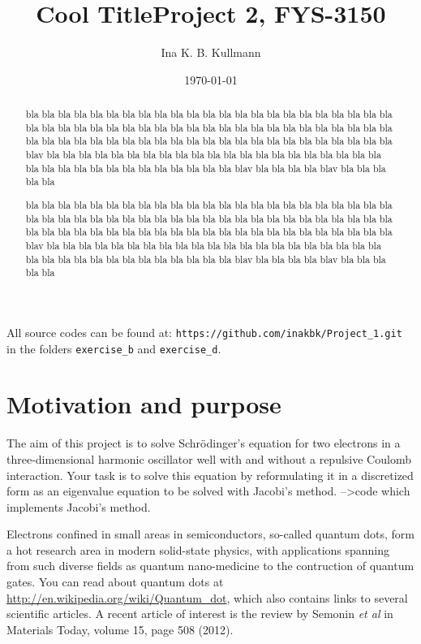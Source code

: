 \documentclass[11pt,a4wide]{article}
\title{{\Huge {\bf Cool Title}}\linebreak \small{Project 2, FYS-3150}}
\author{Ina K. B. Kullmann}
\date{\today}
\begin{document}
\maketitle

{\scriptsize \noindent All source codes can be found at: \texttt{https://github.com/inakbk/Project\_1.git} in the folders \texttt{exercise\_b} and \texttt{exercise\_d}. }

\tableofcontents
\newpage

\begin{abstract}
bla bla bla bla bla bla bla bla bla bla bla bla bla bla bla bla bla bla bla bla bla bla bla bla bla bla bla bla bla bla bla bla bla bla bla bla bla bla bla bla bla bla bla bla bla bla bla bla bla bla bla bla bla bla bla bla bla bla bla bla bla bla bla bla bla bla bla bla bla blav bla bla bla bla bla bla bla bla bla bla bla bla bla bla bla bla bla bla bla bla bla bla bla bla bla bla bla bla bla bla bla bla bla bla blav bla bla bla bla blav bla bla bla bla bla

bla bla bla bla bla bla bla bla bla bla bla bla bla bla bla bla bla bla bla bla bla bla bla bla bla bla bla bla bla bla bla bla bla bla bla bla bla bla bla bla bla bla bla bla bla bla bla bla bla bla bla bla bla bla bla bla bla bla bla bla bla bla bla bla bla bla bla bla bla blav bla bla bla bla bla bla bla bla bla bla bla bla bla bla bla bla bla bla bla bla bla bla bla bla bla bla bla bla bla bla bla bla bla bla blav bla bla bla bla blav bla bla bla bla bla
\end{abstract}


\section{Motivation and purpose}
The aim of this project is to solve Schr\"odinger's equation for two electrons in a three-dimensional harmonic oscillator well with and without a repulsive Coulomb interaction.  Your task is to solve this equation by reformulating it in a discretized form as an eigenvalue equation to be solved with Jacobi's method. -->code which implements Jacobi's method.

Electrons confined in small areas in semiconductors, so-called quantum dots, form a hot research area in modern solid-state physics, with applications spanning from such diverse fields as quantum nano-medicine to the contruction of quantum gates. You can read about quantum dots at \url{http://en.wikipedia.org/wiki/Quantum_dot}, which also contains links to several scientific articles. A recent article of interest is the review by Semonin {\em et al} in Materials Today, volume 15, page 508 (2012).
\end{document}
